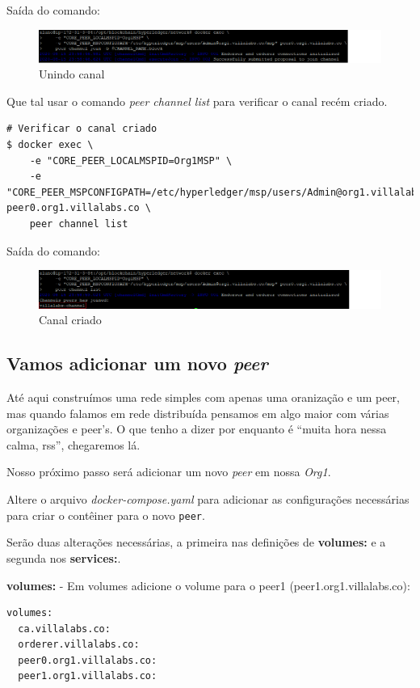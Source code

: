 \documentclass[a4paper,11pt]{article}
\begin{document}
Saída do comando:
\begin{figure}[H]
  \centering
  \includegraphics[width=1.1\textwidth]{imagens/join-canal.png}
  \caption{Unindo canal}
\end{figure}

Que tal usar o comando \textit{peer channel list} para verificar o canal recém criado.
\begin{lstlisting}
# Verificar o canal criado
$ docker exec \
    -e "CORE_PEER_LOCALMSPID=Org1MSP" \
    -e "CORE_PEER_MSPCONFIGPATH=/etc/hyperledger/msp/users/Admin@org1.villalabs.co/msp" peer0.org1.villalabs.co \
    peer channel list
\end{lstlisting}

Saída do comando:
\begin{figure}[H]
  \centering
  \includegraphics[width=1.1\textwidth]{imagens/lista-canal.png}
  \caption{Canal criado}
\end{figure}

\subsection{Vamos adicionar um novo \textit{peer}}
Até aqui construímos uma rede simples com apenas uma oranização e um peer, mas quando falamos em rede distribuída pensamos em algo maior com várias organizações e peer's. O que tenho a dizer por enquanto é ``muita hora nessa calma, rss'', chegaremos lá.

Nosso próximo passo será adicionar um novo \textit{peer} em nossa \textit{Org1}.

Altere o arquivo \textit{docker-compose.yaml} para adicionar as configurações necessárias para criar o contêiner para o novo \texttt{peer}.

Serão duas alterações necessárias, a primeira nas definições de \textbf{volumes:} e a segunda nos \textbf{services:}.

\textbf{volumes:} - Em volumes adicione o volume para o peer1 (peer1.org1.villalabs.co):
\begin{lstlisting}
volumes:
  ca.villalabs.co:
  orderer.villalabs.co:
  peer0.org1.villalabs.co:
  peer1.org1.villalabs.co:
\end{lstlisting}
\end{document}
